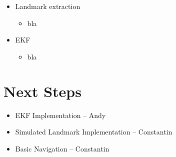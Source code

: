 \documentclass[12pt]{article}
\begin{document}
\begin{itemize}
    \setlength{\itemsep}{0pt}
    \setlength{\parskip}{0pt}
    \setlength{\parsep}{0pt}
    \item Landmark extraction
    \begin{itemize}
        \setlength{\itemsep}{0pt}
        \setlength{\parskip}{0pt}
        \setlength{\parsep}{0pt}
        \item bla
    \end{itemize}
    
    \item EKF
    \begin{itemize}
        \setlength{\itemsep}{0pt}
        \setlength{\parskip}{0pt}
        \setlength{\parsep}{0pt}
        \item bla
    \end{itemize}
\end{itemize}

\section{Next Steps}

\begin{itemize}
    \setlength{\itemsep}{0pt}
    \setlength{\parskip}{0pt}
    \setlength{\parsep}{0pt}
    \item EKF Implementation -- Andy
    \item Simulated Landmark Implementation -- Constantin
    \item Basic Navigation -- Constantin
\end{itemize}
\end{document}

